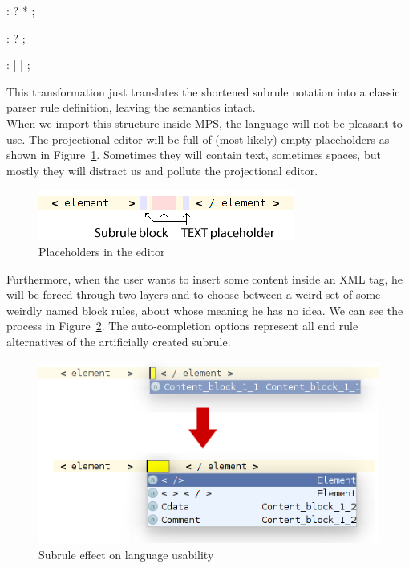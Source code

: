 \begin{antlr}
	          :   ? * ;

	 :    ?
	                 ;

	 :   
	                 |   
	                 |   
	                 ;
\end{antlr}

This transformation just translates the shortened subrule notation into a classic parser rule definition, leaving the semantics intact.
\\

When we import this structure inside MPS, the language will not be pleasant to use.
The projectional editor will be full of (most likely) empty  placeholders as shown in Figure~\ref{fig:text_placeholders}.
Sometimes they will contain text, sometimes spaces, but mostly they will distract us and pollute the projectional editor.

\begin{figure}[h]
	\centering
	\includegraphics[scale=0.75]{./img/text_placeholders.png}
	\caption{Placeholders in the editor}
	\label{fig:text_placeholders}
\end{figure}

Furthermore, when the user wants to insert some content inside an XML tag, he will be forced through two layers and to choose between a weird set of some weirdly named block rules, about whose meaning he has no idea.
We can see the process in Figure~\ref{fig:subrule_problem}.
The auto-completion options represent all end rule alternatives of the artificially created  subrule.
\\

\begin{figure}[h]
	\centering
	\includegraphics[scale=0.75]{./img/subrule_problem.png}
	\caption{Subrule effect on language usability}
	\label{fig:subrule_problem}
\end{figure}

